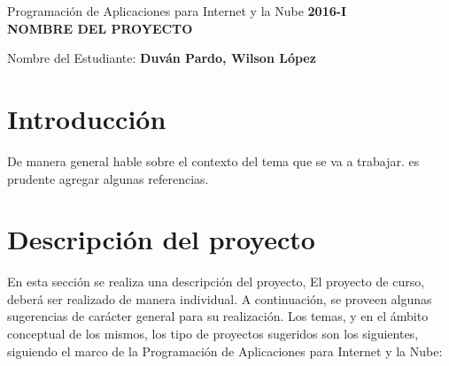 \documentclass[10pt]{article}   			%
\begin{document}
	\renewcommand{\headrulewidth}{0.5pt}

	\thispagestyle{empty}						%
	\begin{center}
		\large {Programación de Aplicaciones para Internet y la Nube
			\hspace{5 cm}\textbf{2016-I}}
		\bigskip  
		\textbf{
			\LARGE{\\NOMBRE DEL PROYECTO}}\\								%
	\end{center}	
	\begin{flushright}	
		\bigskip	
		Nombre del Estudiante: \textbf{Duván Pardo, Wilson López}			%
	\end{flushright} 
	
\section{Introducción}

De manera general  hable sobre el  contexto del tema que se va a trabajar. es prudente agregar algunas referencias.
		
\section{Descripción del proyecto}

En esta sección se realiza una descripción del proyecto, El proyecto de curso, deberá ser realizado de manera individual. A continuación, se proveen algunas sugerencias de carácter general para su realización. Los temas, y en el ámbito conceptual de los mismos, los tipo de proyectos sugeridos son los siguientes, siguiendo el marco de la Programación de Aplicaciones para Internet y la Nube:
		
\end{document}
